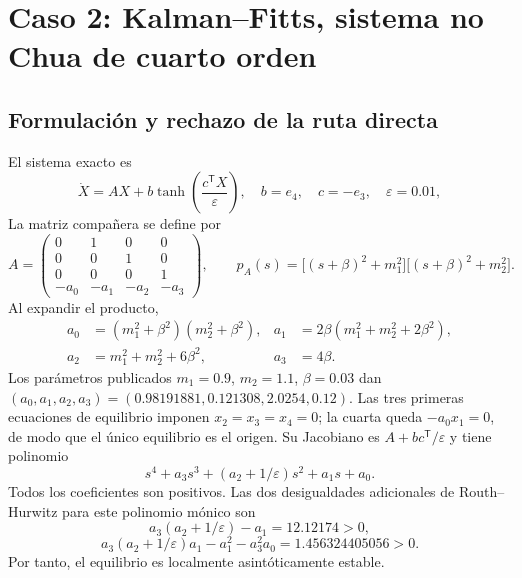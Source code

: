 \section[Caso 2: Kalman--Fitts no Chua]
{Caso 2: Kalman--Fitts, sistema no Chua de cuarto orden}

\subsection{Formulación y rechazo de la ruta directa}

El sistema exacto es
\begin{equation}
 \dot X=AX+b\tanh\!\left(\frac{c^{\mathsf T}X}{\varepsilon}\right),
 \quad b=e_4,\quad c=-e_3,\quad \varepsilon=0.01,
 \label{int:eq:kf}
\end{equation}
La matriz compañera se define por
\[
 A=\begin{pmatrix}
 0&1&0&0\\0&0&1&0\\0&0&0&1\\-a_0&-a_1&-a_2&-a_3
 \end{pmatrix},
 \qquad
 p_A(s)=\bigl[(s+\beta)^2+m_1^2\bigr]
         \bigl[(s+\beta)^2+m_2^2\bigr].
\]
Al expandir el producto,
\begin{align*}
 a_0&=(m_1^2+\beta^2)(m_2^2+\beta^2),&
 a_1&=2\beta(m_1^2+m_2^2+2\beta^2),\\
 a_2&=m_1^2+m_2^2+6\beta^2,&a_3&=4\beta.
\end{align*}
Los parámetros publicados \(m_1=0.9\), \(m_2=1.1\), \(\beta=0.03\)
\cite{kalman2019} dan
\((a_0,a_1,a_2,a_3)=(0.98191881,0.121308,2.0254,0.12)\).
Las tres primeras ecuaciones de equilibrio imponen
\(x_2=x_3=x_4=0\); la cuarta queda \(-a_0x_1=0\), de modo que el único
equilibrio es el origen. Su Jacobiano es \(A+bc^{\mathsf T}/\varepsilon\)
y tiene polinomio
\[
 s^4+a_3s^3+(a_2+1/\varepsilon)s^2+a_1s+a_0.
\]
Todos los coeficientes son positivos. Las dos desigualdades adicionales de
Routh--Hurwitz para este polinomio mónico son
\[
 a_3(a_2+1/\varepsilon)-a_1=12.12174>0,
\]
\[
 a_3(a_2+1/\varepsilon)a_1-a_1^2-a_3^2a_0
 =1.456324405056>0.
\]
Por tanto, el equilibrio es localmente asintóticamente estable.

